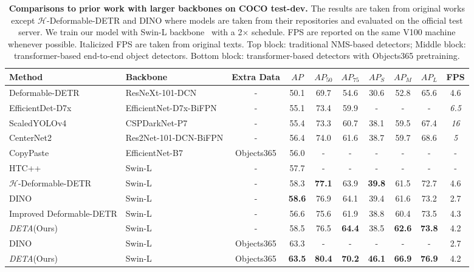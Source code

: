 \documentclass[10pt,twocolumn,letterpaper]{article}
\newcommand{\lbltbl}[1]{\label{tbl:#1}}
\def\name{{\textit{DETA}}\xspace}
\begin{document}
\begin{table*}
\centering
\begin{tabular}{@{}l@{\ }l@{\ }c@{\ \ \ \ }c@{\ \ \ \ }c@{\ \ \ \ }c@{\ \ \ \ }c@{\ \ \ \ }c@{\ \ \ \ }c@{\ \ \ \ }c@{}}
\toprule
Method       & Backbone & Extra Data & $AP$  & $AP_{50}$ & $AP_{75}$ & $AP_S$ & $AP_M$ & $AP_L$ & FPS \\
\toprule
Deformable-DETR~\cite{zhu2020deformable} & ResNeXt-101-DCN & - & 50.1 & 69.7 & 54.6 & 30.6 & 52.8 & 65.6 & 4.6 \\
EfficientDet-D7x~\cite{tan2020efficientdet} & EfficientNet-D7x-BiFPN & - & 55.1 & {73.4} & 59.9 & - & - & - & \textit{6.5} \\
ScaledYOLOv4~\cite{wang2020scaled} & CSPDarkNet-P7 & - & 55.4 & {73.3} & 60.7 & {38.1} & {59.5} & 67.4 & \textit{16}\\
CenterNet2~\cite{zhou2021probablistic} & Res2Net-101-DCN-BiFPN & - & 56.4 & 74.0 & 61.6 & 38.7 & 59.7 & 68.6 & \textit{5} \\
CopyPaste~\cite{ghiasi2021simple} & EfficientNet-B7 & Objects365 &  56.0 & - & - & - & - & - & - \\
HTC++~\cite{chen2019hybrid, liu2021swin} & Swin-L    & - & 57.7 & - & - & - &  - & - & - \\
\midrule
$\mathcal{H}$-Deformable-DETR~\cite{jia2022detrs}& Swin-L & - & 58.3 & \textbf{77.1} & 63.9 & \textbf{39.8} & 61.5 & 72.7 & 4.6 \\
DINO~\cite{zhang2022dino} & Swin-L & - & \textbf{58.6} & 76.9 & 64.1 & 39.4 & 61.6 & 73.2 & 2.7 \\
Improved Deformable-DETR  & Swin-L & - & 56.6 & 75.6 & 61.9 & 38.8 & 60.4 & 73.5 & 4.3 \\
\name (Ours)  & Swin-L & - & 58.5 & 76.5 & \textbf{64.4} & 38.5 & \textbf{62.6} & \textbf{73.8} & 4.2 \\
\midrule
DINO~\cite{zhang2022dino} & Swin-L & Objects365 & 63.3 & - & - & - & - & - & 2.7 \\
\name (Ours)  & Swin-L & Objects365 & \textbf{63.5} & \textbf{80.4} & \textbf{70.2} & \textbf{46.1} & \textbf{66.9} & \textbf{76.9} & 4.2 \\
\bottomrule
\end{tabular}
\caption{
\textbf{Comparisons to prior work with larger backbones on COCO test-dev.}
The results are taken from original works except $\mathcal{H}$-Deformable-DETR and DINO where models are taken from their repositories and evaluated on the official test server.
We train our model with Swin-L backbone~\cite{liu2021swin} with a 2$\times$ schedule.
FPS are reported on the same V100 machine whenever possible.
Italicized FPS are taken from original texts.
Top block: traditional NMS-based detectors; Middle block: transformer-based end-to-end object detectors. Bottom block: transformer-based detectors with Objects365 pretraining. 
}
\lbltbl{swin}
\end{table*}
\end{document}
